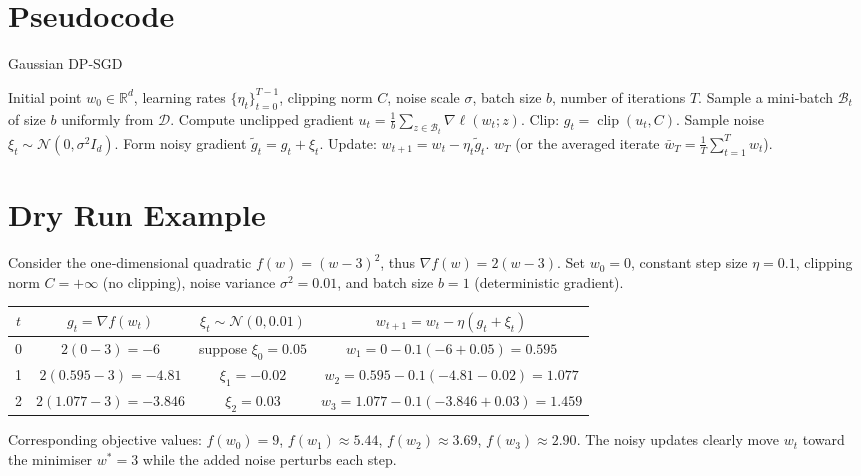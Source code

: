 \documentclass{article}
\begin{document}
\section*{Pseudocode}
\begin{algorithm}[H]
\caption{Gaussian DP‑SGD}
\begin{algorithmic}[1]
\REQUIRE Initial point $w_{0}\in\mathbb{R}^{d}$, learning rates $\{\eta_{t}\}_{t=0}^{T-1}$, clipping norm $C$, noise scale $\sigma$, batch size $b$, number of iterations $T$.
    \STATE Sample a mini‑batch $\mathcal{B}_{t}$ of size $b$ uniformly from $\mathcal{D}$.
    \STATE Compute unclipped gradient $u_{t}= \frac{1}{b}\sum_{z\in\mathcal{B}_{t}}\nabla\ell(w_{t};z)$.
    \STATE Clip: $g_{t}= \operatorname{clip}(u_{t},C)$.
    \STATE Sample noise $\xi_{t}\sim\mathcal{N}(0,\sigma^{2}I_{d})$.
    \STATE Form noisy gradient $\tilde g_{t}=g_{t}+\xi_{t}$.
    \STATE Update: $w_{t+1}=w_{t}-\eta_{t}\tilde g_{t}$.
\ENDFOR
\RETURN $w_{T}$ (or the averaged iterate $\bar w_{T}=\frac1T\sum_{t=1}^{T}w_{t}$).
\end{algorithmic}
\end{algorithm}

\section*{Dry Run Example}
Consider the one‑dimensional quadratic $f(w)=(w-3)^{2}$, thus $\nabla f(w)=2(w-3)$.  
Set $w_{0}=0$, constant step size $\eta=0.1$, clipping norm $C=+\infty$ (no clipping), noise variance $\sigma^{2}=0.01$, and batch size $b=1$ (deterministic gradient).  

\begin{center}
\begin{tabular}{c|c|c|c}
$t$ & $g_{t}= \nabla f(w_{t})$ & $\xi_{t}\sim\mathcal N(0,0.01)$ & $w_{t+1}=w_{t}-\eta(g_{t}+\xi_{t})$ \\ \hline
0 & $2(0-3)=-6$ & suppose $\xi_{0}=0.05$ & $w_{1}=0-0.1(-6+0.05)=0.595$ \\
1 & $2(0.595-3)=-4.81$ & $\xi_{1}=-0.02$ & $w_{2}=0.595-0.1(-4.81-0.02)=1.077$ \\
2 & $2(1.077-3)=-3.846$ & $\xi_{2}=0.03$ & $w_{3}=1.077-0.1(-3.846+0.03)=1.459$ 
\end{tabular}
\end{center}
Corresponding objective values:
$f(w_{0})=9$, $f(w_{1})\approx5.44$, $f(w_{2})\approx3.69$, $f(w_{3})\approx2.90$.
The noisy updates clearly move $w_{t}$ toward the minimiser $w^{*}=3$ while the added noise perturbs each step.
\end{document}

